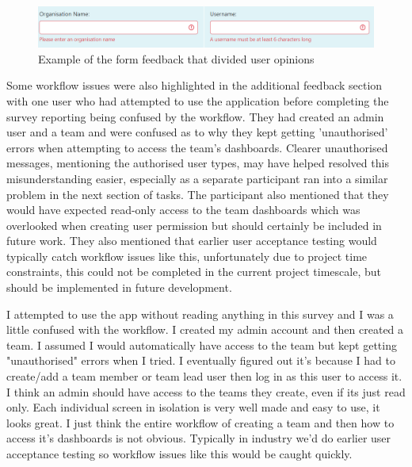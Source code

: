 \documentclass[l4proj.tex]{subfiles}
\begin{document}
\begin{figure}[h!]
\begin{center}
\includegraphics[scale=0.57]{dissertation/images/EvaluationExampleOfFormFeedback.png}
\caption{Example of the form feedback that divided user opinions}
\label{fig:admin form feedback} 
\end{center}
\end{figure}

Some workflow issues were also highlighted in the additional feedback section with one user who had attempted to use the application before completing the survey reporting being confused by the workflow. They had created an admin user and a team and were confused as to why they kept getting 'unauthorised' errors when attempting to access the team's dashboards. Clearer unauthorised messages, mentioning the authorised user types, may have helped resolved this misunderstanding easier, especially as a separate participant ran into a similar problem in the next section of tasks. The participant also mentioned that they would have expected read-only access to the team dashboards which was overlooked when creating user permission but should certainly be included in future work. They also mentioned that earlier user acceptance testing would typically catch workflow issues like this, unfortunately due to project time constraints, this could not be completed in the current project timescale, but should be implemented in future development.

I attempted to use the app without reading anything in this survey and I was a little confused with the workflow. I created my admin account and then created a team. I assumed I would automatically have access to the team but kept getting "unauthorised" errors when I tried. I eventually figured out it's because I had to create/add a team member or team lead user then log in as this user to access it. I think an admin should have access to the teams they create, even if its just read only. Each individual screen in isolation is very well made and easy to use, it looks great. I just think the entire workflow of creating a team and then how to access it's dashboards is not obvious. Typically in industry we'd do earlier user acceptance testing so workflow issues like this would be caught quickly.
\end{document}

